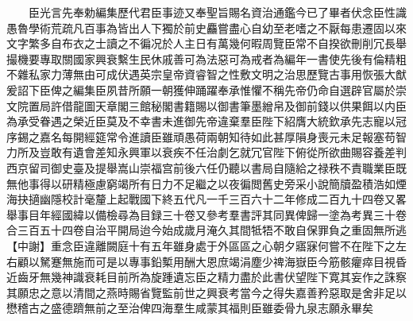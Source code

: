 　　臣光言先奉勅編集歷代君臣事迹又奉聖旨賜名資治通鑑今已了畢者伏念臣性識愚魯學術荒疏凡百事為皆出人下獨於前史麤嘗盡心自幼至老嗜之不厭每患遷固以來文字繁多自布衣之士讀之不徧况於人主日有萬幾何暇周覽臣常不自揆欲刪削冗長舉撮機要專取關國家興衰繫生民休戚善可為法惡可為戒者為編年一書使先後有倫精粗不雜私家力薄無由可成伏遇英宗皇帝資睿智之性敷文明之治思歷覽古事用恢張大猷爰詔下臣俾之編集臣夙昔所願一朝獲伸踊躍奉承惟懼不稱先帝仍命自選辟官屬於崇文院置局許借龍圖天章閣三館秘閣書籍賜以御書筆墨繒帛及御前錢以供果餌以内臣為承受眷遇之榮近臣莫及不幸書未進御先帝違棄羣臣陛下紹膺大統欽承先志寵以冠序錫之嘉名每開經筵常令進讀臣雖頑愚荷兩朝知待如此甚厚隕身喪元未足報塞苟智力所及豈敢有遺會差知永興軍以衰疾不任治劇乞就冗官陛下俯從所欲曲賜容養差判西京留司御史臺及提舉嵩山崇福宫前後六任仍聽以書局自隨給之禄秩不責職業臣既無他事得以研精極慮窮竭所有日力不足繼之以夜徧閲舊史旁采小說簡牘盈積浩如煙海抉擿幽隱校計毫釐上起戰國下終五代凡一千三百六十二年修成二百九十四卷又畧舉事目年經國緯以備檢尋為目録三十卷又參考羣書評其同異俾歸一塗為考異三十卷合三百五十四卷自治平開局迨今始成歲月淹久其間牴牾不敢自保罪負之重固無所逃【中謝】重念臣違離闕庭十有五年雖身處于外區區之心朝夕寤寐何嘗不在陛下之左右顧以駑蹇無施而可是以專事鉛槧用酬大恩庶竭涓塵少禆海嶽臣今筋骸癯瘁目視昏近齒牙無幾神識衰耗目前所為旋踵遺忘臣之精力盡於此書伏望陛下寛其妄作之誅察其願忠之意以清間之燕時賜省覽監前世之興衰考當今之得失嘉善矜惡取是舍非足以懋稽古之盛德躋無前之至治俾四海羣生咸蒙其福則臣雖委骨九泉志願永畢矣  
    


 


 



 

 
  







 


　　
　　
　
　
　


　　

　















	
	









































